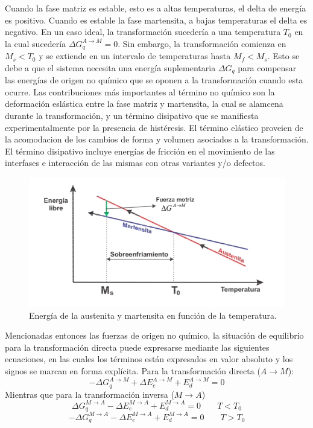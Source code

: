 \documentclass[12pt]{article}
\theoremstyle{definition}
\theoremstyle{remark}
\begin{document}
Cuando la fase matriz es estable, esto es a altas temperaturas, el delta de energía es positivo. Cuando es estable la fase martensita, a bajas temperaturas el delta es negativo. En un caso ideal, la transformación sucedería a una temperatura $T_0$ en la cual sucedería $\Delta G^{A \rightarrow M}_q = 0$. Sin embargo, la transformación comienza en $M_s < T_0$ y se extiende en un intervalo de temperaturas hasta $M_f < M_s$. Esto se debe a que el sistema necesita una energía suplementaria $\Delta G_q$ para compensar las energías de origen no químico que se oponen a la transformación cuando esta ocurre. Las contribuciones más importantes al término no químico son la deformación eslástica entre la fase matriz y martensita, la cual se alamcena durante la transformación, y un término disipativo que se manifiesta experimentalmente por la presencia de histéresis. El término elástico proveien de la acomodacion de los cambios de forma y volumen asociados a la transformación. El término disipativo incluye energías de fricción en el movimiento de las interfases e interacción de las mismas con otras variantes y/o defectos.

\begin{figure}
	\label{Gibbs}
	\includegraphics[scale=0.5]{img/Gibbs.png}
	\caption{Energía de la austenita y martensita en función de la temperatura.}
\end{figure}


Mencionadas entonces las fuerzas de origen no químico, la situación de equilibrio para la transformación directa puede expresarse mediante las siguientes ecuaciones, en las cuales los términos están expresados en valor absoluto y los signos se marcan en forma explícita. Para la transformación directa ($A \rightarrow M$):
\begin{equation}\label{GibbsEq1}
	- \Delta G^{A \rightarrow M}_q + \Delta E^{A \rightarrow M}_e + E^{A \rightarrow M}_d = 0 
\end{equation}
Mientras que para la transformación inversa ($M \rightarrow A$)
\begin{equation}
	\Delta G^{M \rightarrow A}_q - \Delta E^{M \rightarrow A}_e + E^{M \rightarrow A}_d = 0 \;\;\;\;\;\;\; T<T_0
\end{equation}
\begin{equation}
	- \Delta G^{M \rightarrow A}_q - \Delta E^{M \rightarrow A}_e + E^{M \rightarrow A}_d = 0 \;\;\;\;\;\;\; T>T_0
\end{equation}
\end{document}
